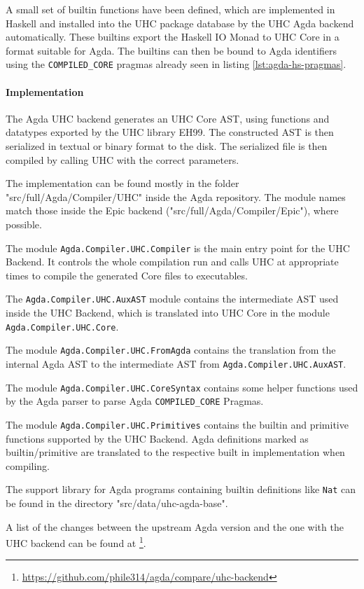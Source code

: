 \documentclass[12pt, a4paper, twoside]{report}
\begin{document}
A small set of builtin functions have been defined, which are implemented in Haskell
and installed into the UHC package database by the UHC Agda backend automatically. These
builtins export the Haskell IO Monad to UHC Core in a format suitable for Agda.
The builtins can then be bound to Agda identifiers using the \texttt{COMPILED_CORE} pragmas
already seen in listing \ref{lst:agda-hs-pragmas}.


\paragraph{Implementation}
The Agda UHC backend generates an UHC Core AST, using functions and datatypes exported
by the UHC library EH99. The constructed AST is then serialized in textual or binary format
to the disk. The serialized file is then compiled by calling UHC with the correct parameters.

The implementation can be found mostly in the folder "src/full/Agda/Compiler/UHC" inside
the Agda repository. The module
names match those inside the Epic backend ("src/full/Agda/Compiler/Epic"), where possible.

The module \texttt{Agda.Compiler.UHC.Compiler} is the main entry point for the UHC Backend.
It controls the whole compilation run and calls UHC at appropriate times to compile the
generated Core files to executables.

The \texttt{Agda.Compiler.UHC.AuxAST} module contains the intermediate AST used inside the UHC Backend,
which is translated into UHC Core in the module \texttt{Agda.Compiler.UHC.Core}.

The module \texttt{Agda.Compiler.UHC.FromAgda} contains the translation from the internal Agda AST
to the intermediate AST from \texttt{Agda.Compiler.UHC.AuxAST}.

The module \texttt{Agda.Compiler.UHC.CoreSyntax} contains some helper functions used by
the Agda parser to parse Agda \texttt{COMPILED_CORE} Pragmas.

The module \texttt{Agda.Compiler.UHC.Primitives} contains the builtin and primitive functions
supported by the UHC Backend. Agda definitions marked as builtin/primitive are translated
to the respective built in implementation when compiling.


The support library for Agda programs containing builtin definitions like \texttt{Nat} can
be found in the directory "src/data/uhc-agda-base".


A list of the changes between the upstream Agda version and the one with the UHC backend can be found at \footnote{\url{https://github.com/phile314/agda/compare/uhc-backend}}.
\end{document}
